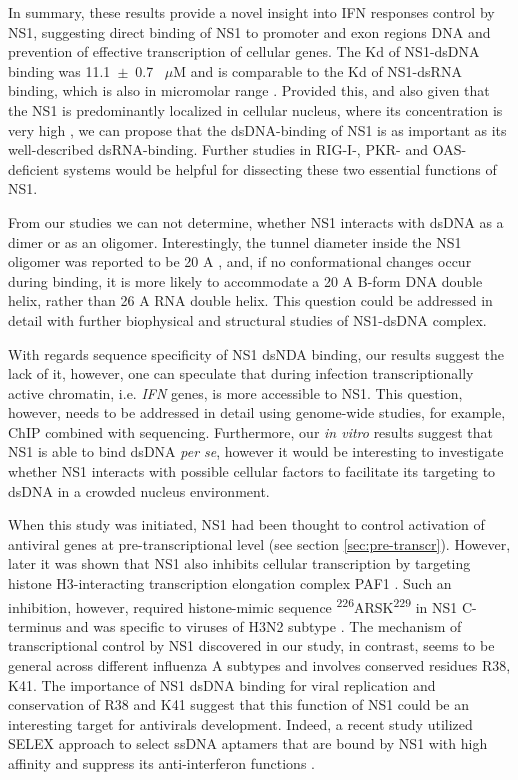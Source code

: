 		In summary, these results provide a novel insight into IFN responses control by NS1, suggesting direct binding of NS1 to promoter and exon regions DNA and prevention of effective transcription of cellular genes. The \gls{Kd} of NS1-dsDNA binding was 11.1~$\pm$~0.7~ $\mu$M and is comparable to the \gls{Kd} of NS1-dsRNA binding, which is also in micromolar range \parencite{Yin2007}. Provided this, and also given that the \gls{NS1} is predominantly localized in cellular nucleus, where its concentration is very high \parencite{Li2010, Marazzi2012}, we can propose that the dsDNA-binding  of NS1 is as important as its well-described dsRNA-binding. Further studies in \gls{RIG-I}-, \gls{PKR}- and \gls{OAS}-deficient systems would be helpful for dissecting these two essential functions of NS1. 
		
		From our studies we can not determine, whether NS1 interacts with dsDNA as a dimer or as an oligomer. Interestingly, the tunnel diameter inside the NS1 oligomer was reported to be 20 \gls{A} \parencite{Bornholdt2008}, and, if no conformational changes occur during binding, it is more likely to accommodate a 20 \gls{A} B-form DNA double helix, rather than 26 \gls{A} RNA double helix. This question could be addressed in detail with further biophysical and structural studies of NS1-dsDNA complex.
		
		With regards sequence specificity of NS1 dsNDA binding, our results suggest the lack of it, however, one can speculate that during infection transcriptionally active chromatin, i.e. \textit{IFN} genes, is more accessible to NS1. This question, however, needs to be addressed in detail using genome-wide studies, for example, \gls{ChIP} combined with sequencing. Furthermore, our \textit{in vitro} results suggest that NS1 is able to bind dsDNA \textit{per se}, however it would be interesting to investigate whether NS1 interacts with possible cellular factors to facilitate its targeting to dsDNA in a crowded nucleus environment.
		
		When this study was initiated, NS1 had been thought to control activation of antiviral genes at pre-transcriptional level (see section \ref{sec:pre-transcr}). However, later it was shown that NS1 also inhibits cellular transcription by targeting histone H3-interacting transcription elongation complex PAF1 \parencite{Marazzi2012}. Such an inhibition, however, required histone-mimic sequence \textsuperscript{226}ARSK\textsuperscript{229} in NS1 C-terminus and was specific to viruses of H3N2 subtype \parencite{Marazzi2012}. The mechanism of transcriptional control by NS1 discovered in our study, in contrast, seems to be general across different influenza A subtypes and involves conserved residues R38, K41. The importance of NS1 dsDNA binding for viral replication and conservation of R38 and K41 suggest that this function of NS1 could be an interesting target for antivirals development. Indeed, a recent study utilized SELEX approach to select ssDNA aptamers that are bound by NS1 with high affinity and suppress its anti-interferon functions \parencite{Woo2013}.
											
